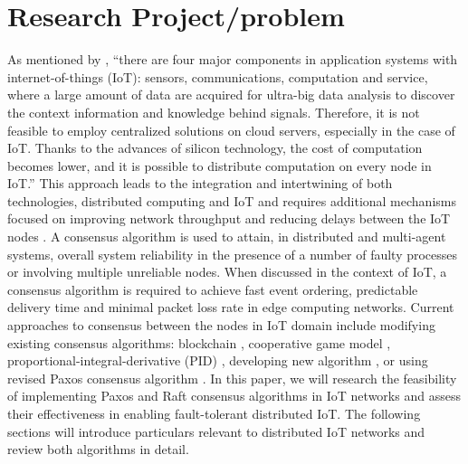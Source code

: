 \documentclass[oneside,12pt]{book}
\begin{document}
\section{Research Project/problem}
\par As mentioned by \cite{7058993}, “there are four major components in application systems with internet-of-things (IoT): sensors, communications, computation and service, where a large amount of data are acquired for ultra-big data analysis to discover the context information and knowledge behind signals. Therefore, it is not feasible to employ centralized solutions on cloud servers, especially in the case of IoT. Thanks to the advances of silicon technology, the cost of computation becomes lower, and it is possible to distribute computation on every node in IoT.” This approach leads to the integration and intertwining of both technologies, distributed computing and IoT and requires additional mechanisms focused on improving network throughput and reducing delays between the IoT nodes \citep{ImpRaft}.\smallskip \newline
A consensus algorithm is used to attain, in distributed and multi-agent systems, overall system reliability in the presence of a number of faulty processes or involving multiple unreliable nodes. When discussed in the context of IoT, a consensus algorithm is required to achieve fast event ordering, predictable delivery time and minimal packet loss rate in edge computing networks.\smallskip \newline
Current approaches to consensus between the nodes in IoT domain include modifying existing consensus algorithms: blockchain \citep{WANG2020101871,10.1007/978-3-030-30278-8_34}, cooperative game model \citep{GULATI2020102222}, proportional-integral-derivative (PID) \citep{SHI201873}, developing new algorithm \citep{8737532}, or using revised Paxos consensus algorithm \citep{10.5555/3324320.3324322,Cachin}.\smallskip \newline 
In this paper, we will research the feasibility of implementing Paxos and Raft consensus algorithms in IoT networks and assess their effectiveness in enabling fault-tolerant distributed IoT. The following sections will introduce particulars relevant to distributed IoT networks and review both algorithms in detail.
\end{document}
